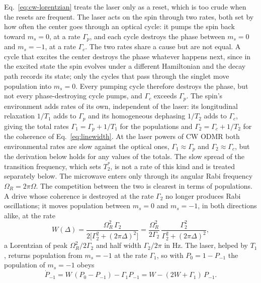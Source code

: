 Eq.~\eqref{eq:cw-lorentzian} treats the laser only as a reset, which is too
crude when the resets are frequent. The laser acts on the spin through two rates, both set by how often the center
goes through an optical cycle: it pumps the spin back toward $m_s=0$, at a rate $\Gamma_p$, and each cycle destroys
the phase between $m_s=0$ and $m_s=-1$, at a rate $\Gamma_c$. The two rates share a cause but are not equal. A cycle
that excites the center destroys the phase whatever happens next, since in the excited state the spin evolves under
a different Hamiltonian and the decay path records its state; only the cycles that pass through the singlet move
population into $m_s=0$. Every pumping cycle therefore destroys the phase, but not every phase-destroying cycle
pumps, and $\Gamma_c$ exceeds $\Gamma_p$.
The spin's environment adds rates of its own, independent of the laser: its longitudinal relaxation $1/T_1$ adds
to $\Gamma_p$ and its homogeneous dephasing $1/T_2$ adds to $\Gamma_c$, giving the total rates
$\Gamma_1=\Gamma_p+1/T_1$ for the populations and $\Gamma_2=\Gamma_c+1/T_2$ for the coherence of
Eq.~\eqref{eq:linewidth}. At the laser powers of CW ODMR both environmental rates are slow against the optical ones,
$\Gamma_1\approx\Gamma_p$ and $\Gamma_2\approx\Gamma_c$, but the derivation below holds for any values of the totals.
The slow spread of the transition frequency, which sets $T_2^*$, is not a rate of this kind and is treated
separately below. The microwave enters only through its angular Rabi
frequency $\Omega_R=2\pi\Omega$. The competition between the two is clearest in terms of populations. A drive whose
coherence is destroyed at the rate $\Gamma_2$ no longer produces Rabi oscillations; it moves population between
$m_s=0$ and $m_s=-1$, in both directions alike, at the rate
\begin{equation}
  W(\Delta)=\frac{\Omega_R^2\,\Gamma_2}{2\big[\Gamma_2^2+(2\pi\Delta)^2\big]}
  =\frac{\Omega_R^2}{2\Gamma_2}\,\frac{\Gamma_2^2}{\Gamma_2^2+(2\pi\Delta)^2},
  \label{eq:transfer-rate}
\end{equation}
a Lorentzian of peak $\Omega_R^2/2\Gamma_2$ and half width $\Gamma_2/2\pi$ in Hz. The laser, helped by $T_1$, returns
population from $m_s=-1$ at the rate $\Gamma_1$, so with $P_0=1-P_{-1}$ the population of $m_s=-1$ obeys
\begin{equation*}
  \dot P_{-1}=W\,(P_0-P_{-1})-\Gamma_1P_{-1}=W-(2W+\Gamma_1)\,P_{-1}.
\end{equation*}
